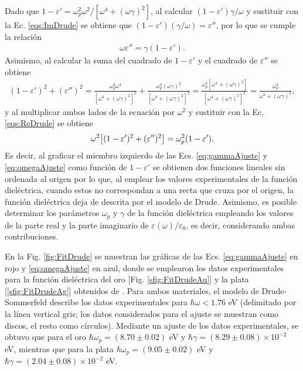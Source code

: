\noindent		
Dado que $1-\varepsilon' = \omega_p^2\omega^2 / [\omega^4 + (\omega\gamma)^2]$, al calcular  $(1-\varepsilon')\gamma/\omega$ y sustituir con la Ec. \eqref{eqs:ImDrude} se obtiene que $	( 1-\varepsilon') (\gamma/\omega)=\varepsilon''$, por lo que se cumple la relación
	\begin{align}
	\omega\varepsilon''= \gamma( 1-\varepsilon'). \label{eq:gammaAjuste}
	\end{align}
Asimismo, al calcular la suma del cuadrado de $1-\varepsilon'$ y el cuadrado de $\varepsilon''$ se obtiene
	\begin{align*}
	( 1-\varepsilon') ^2 + (\varepsilon'')^2 
					=\frac{\omega_p^4 \omega^4}{[\omega^4 + (\omega\gamma)^2]^2}+
									\frac{\omega_p^4 (\omega\gamma)^2}{[\omega^4 + (\omega\gamma)^2]^2}
					= \frac{\omega_p^4[\omega^4 + (\omega\gamma)^2]}{[\omega^4 + (\omega\gamma)^2]^2}
					= \frac{\omega_p^4}{\omega^4 + (\omega\gamma)^2},
		\end{align*}
y al multiplicar ambos lados de la ecuación por $\omega^2$	 y sustituir con la Ec. \eqref{eqs:ReDrude} se obtiene
	\begin{align}
	\omega^2\qty[( 1-\varepsilon') ^2 + (\varepsilon'')^2 ]  
						= \omega_p^2( 1-\varepsilon').
	\label{eq:omegaAjuste}
	\end{align}
Es decir, al graficar el miembro izquierdo de las Ecs. \eqref{eq:gammaAjuste} y \eqref{eq:omegaAjuste} como función de $ 1-\varepsilon'$ se obtienen dos funciones lineales sin ordenada al origen por lo que, al emplear los valores experimentales de la función dieléctrica, cuando estos no correspondan a una recta que cruza por el origen, la función dieléctrica deja de descrita por el modelo de Drude. Asimismo, es posible determinar los parámetros $\omega_p$ y $\gamma$ de la función dieléctrica empleando los valores de la parte real y la parte imaginario de $\varepsilon(\omega)/\varepsilon_0$, es decir, considerando ambas contribuciones.

En la Fig.  \ref{fig:FitDrude} se muestran las gráficas de las Ecs. \eqref{eq:gammaAjuste} en rojo y \eqref{eq:omegaAjuste} en azul, donde se emplearon los datos experimentales para la función dieléctrica del oro [Fig. \ref{sfig:FitDrudeAu}] y la plata [\ref{sfig:FitDrudeAg}] obtenidos de \cite{johnson1972constants}. Para ambos materiales, el modelo de Drude-Sommerfeld describe los datos experimentales para $\hbar\omega<1.76$ eV (delimitado por la línea vertical gris; los datos considerados para el ajuste se muestran como discos, el resto como círculos). Mediante un ajuste de los datos experimentales, se obtuvo que para el oro $\hbar\omega_p=(8.70\pm 0.02)$ eV y $\hbar\gamma = (8.29\pm 0.08)\times 10^{-2}$ eV, mientras que para la plata $\hbar\omega_p=(9.05\pm 0.02)$ eV y $\hbar\gamma = (2.04\pm 0.08)\times 10^{-2}$ eV.


